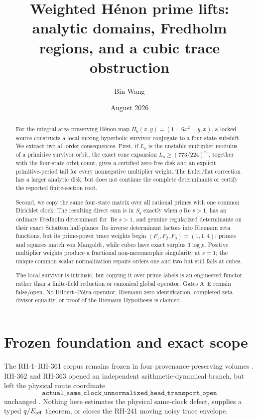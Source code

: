 \documentclass[11pt]{article}
\title{Weighted H\'enon prime lifts:\\
analytic domains, Fredholm regions, and a cubic trace obstruction}
\author{Bin Wang}
\date{August 2026}
\numberwithin{equation}{section}
\theoremstyle{remark}
\newcommand{\RePart}{\operatorname{Re}}
\begin{document}
\maketitle

\begin{abstract}
For the integral area-preserving H\'enon map
\(
H_6(x,y)=(1-6x^2-y,x)
\), a locked source constructs a local mixing hyperbolic survivor conjugate
to a four-state subshift.  We extract two all-order consequences.  First, if
\(L_o\) is the unstable multiplier modulus of a primitive survivor orbit,
the exact cone expansion \(L_o\ge(773/224)^{n_o}\), together with the
four-state orbit count, gives a certified zero-free disk and an explicit
primitive-period tail for every nonnegative multiplier weight.  The
Euler/flat correction has a larger analytic disk, but does not continue the
complete determinants or certify the reported finite-section root.

Second, we copy the same four-state matrix over all rational primes with one
common Dirichlet clock.  The resulting direct sum is in \(S_q\) exactly when
\(q\RePart s>1\), has an ordinary Fredholm determinant for \(\RePart s>1\),
and genuine regularized determinants on their exact Schatten half-planes.
Its inverse determinant factors into Riemann zeta functions, but its
prime-power trace weights begin
\(
(F_1,F_2,F_3)=(1,1,4)
\): primes and squares match von Mangoldt, while cubes have exact surplus
\(3\log p\).  Positive multiplier weights produce a fractional
non-meromorphic singularity at \(s=1\); the unique common scalar
normalization repairs orders one and two but still fails at cubes.

The local survivor is intrinsic, but copying it over prime labels is an
engineered functor rather than a finite-field reduction or canonical global
operator.  Gates A--E remain false/open.  No Hilbert--P\'olya operator,
Riemann-zero identification, completed-zeta divisor equality, or proof of the
Riemann Hypothesis is claimed.
\end{abstract}

\section{Frozen foundation and exact scope}

The RH-1--RH-361 corpus remains frozen in four provenance-preserving volumes
\citep{WangRHCorpus2026}.  RH-362 and RH-363 opened an independent
arithmetic-dynamical branch, but left the physical route coordinate
\begin{equation}
 \texttt{actual\_same\_clock\_unnormalized\_head\_transport\_open}
 \label{eq:physical-coordinate}
\end{equation}
unchanged \citep{WangRH3632026}.  Nothing here estimates the physical
same-clock defect, supplies a typed \(q/E_{\rm off}\) theorem, or closes the
RH-241 moving noisy trace envelope.
\end{document}
